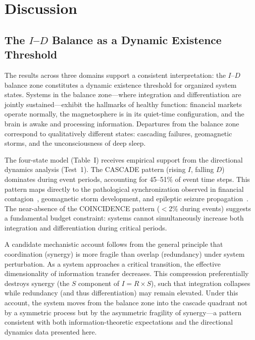 \documentclass[aip,cha,reprint,amsmath,amssymb]{revtex4-2}
\begin{document}
\section{Discussion}

\subsection{The $I$--$D$ Balance as a Dynamic Existence Threshold}

The results across three domains support a consistent interpretation: the $I$--$D$ balance zone constitutes a dynamic existence threshold for organized system states. Systems in the balance zone---where integration and differentiation are jointly sustained---exhibit the hallmarks of healthy function: financial markets operate normally, the magnetosphere is in its quiet-time configuration, and the brain is awake and processing information. Departures from the balance zone correspond to qualitatively different states: cascading failures, geomagnetic storms, and the unconsciousness of deep sleep.

The four-state model (Table~I) receives empirical support from the directional dynamics analysis (Test~1). The CASCADE pattern (rising $I$, falling $D$) dominates during event periods, accounting for 45--51\% of event time steps. This pattern maps directly to the pathological synchronization observed in financial contagion~\cite{forbes2002}, geomagnetic storm development, and epileptic seizure propagation~\cite{lehnertz2009}. The near-absence of the COINCIDENCE pattern ($<$2\% during events) suggests a fundamental budget constraint: systems cannot simultaneously increase both integration and differentiation during critical periods.

A candidate mechanistic account follows from the general principle that coordination (synergy) is more fragile than overlap (redundancy) under system perturbation. As a system approaches a critical transition, the effective dimensionality of information transfer decreases. This compression preferentially destroys synergy (the $S$ component of $I = R \times S$), such that integration collapses while redundancy (and thus differentiation) may remain elevated. Under this account, the system moves from the balance zone into the cascade quadrant not by a symmetric process but by the asymmetric fragility of synergy---a pattern consistent with both information-theoretic expectations and the directional dynamics data presented here.
\end{document}
